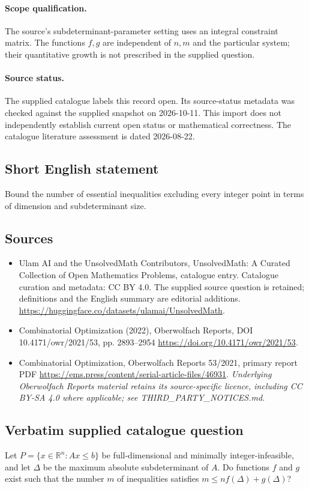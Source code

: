 \documentclass[11pt]{article}
\begin{document}
\paragraph{Scope qualification.}
The source's subdeterminant-parameter setting uses an integral constraint matrix. The functions $f,g$ are independent of $n,m$ and the particular system; their quantitative growth is not prescribed in the supplied question.
\paragraph{Source status.}
The supplied catalogue labels this record open. Its source-status metadata was checked against the supplied snapshot on 2026-10-11. This import does not independently establish current open status or mathematical correctness. The catalogue literature assessment is dated 2026-08-22.
\subsection{Short English statement}
Bound the number of essential inequalities excluding every integer point in terms of dimension and subdeterminant size.
\subsection{Sources}
\begin{itemize}
\item[S1] Ulam AI and the UnsolvedMath Contributors, UnsolvedMath: A Curated Collection of Open Mathematics Problems, catalogue entry. Catalogue curation and metadata: CC BY 4.0. The supplied source question is retained; definitions and the English summary are editorial additions.
\url{https://huggingface.co/datasets/ulamai/UnsolvedMath}.
\item[S2] Combinatorial Optimization (2022), Oberwolfach Reports, DOI 10.4171/owr/2021/53, pp. 2893--2954
\url{https://doi.org/10.4171/owr/2021/53}.
\item[S3] Combinatorial Optimization, Oberwolfach Reports 53/2021, primary report PDF
\url{https://ems.press/content/serial-article-files/46931}.
\textit{Underlying Oberwolfach Reports material retains its source-specific licence, including CC BY-SA 4.0 where applicable; see THIRD\_PARTY\_NOTICES.md.}
\end{itemize}
\subsection{Verbatim supplied catalogue question}
Let $P=\{x\in\mathbb R^n:Ax\leq b\}$ be full-dimensional and minimally integer-infeasible, and let $\Delta$ be the maximum absolute subdeterminant of $A$. Do functions $f$ and $g$ exist such that the number $m$ of inequalities satisfies $m\leq nf(\Delta)+g(\Delta)$?
\end{document}
